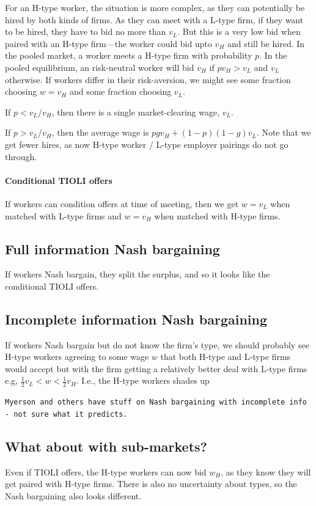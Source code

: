 \documentclass[12pt]{article}
\begin{document}
For an H-type worker, the situation is more complex, as they can potentially be hired by both kinds of firms. 
As they can meet with a L-type firm, if they want to be hired, they have to bid no more than $v_L$.
But this is a very low bid when paired with an H-type firm---the worker could bid upto $v_H$ and still be hired.
In the pooled market, a worker meets a H-type firm with probability $p$. 
In the pooled equilibrium, an risk-neutral worker will bid $v_H$ if $p v_H > v_L$ and $v_L$ otherwise. 
If workers differ in their risk-aversion, we might see some fraction choosing $w = v_H$ and some fraction choosing $v_L$.

If $p < v_L / v_H$, then there is a single market-clearing wage, $v_L$.

If $p > v_L / v_H$, then the average wage is $pg v_H + (1-p)(1- g)v_L$.
Note that we get fewer hires, as now H-type worker / L-type employer pairings do not go through. 

\paragraph{Conditional TIOLI offers} 
If workers can condition offers at time of meeting, then we get $w = v_L$ when matched with L-type firms and $w = v_H$ when matched with H-type firms. 

\subsection{Full information Nash bargaining}
If workers Nash bargain, they split the surplus, and so it looks like the conditional TIOLI offers. 

\subsection{Incomplete information Nash bargaining}
If workers Nash bargain but do not know the firm's type, we should probably see H-type workers agreeing to some wage $w$ that both H-type and L-type firms would accept but with the firm getting a relatively better deal with L-type firms e.g, $\frac{1}{2} v_L < w < \frac{1}{2}v_H$.
I.e., the H-type workers shades up 

\verb+Myerson and others have stuff on Nash bargaining with incomplete info - not sure what it predicts.+

\subsection{What about with sub-markets?}
Even if TIOLI offers, the H-type workers can now bid $w_H$, as they know they will get paired with H-type firms.
There is also no uncertainty about types, so the Nash bargaining also looks different.
\end{document}

